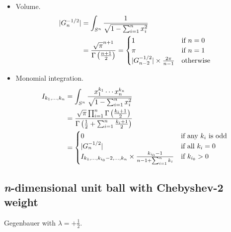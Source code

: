 \documentclass[draft]{scrartcl}
\begin{document}
\begin{itemize}
  \item Volume.
    \begin{align}\nonumber
    |G_n^{-1/2}|
      &= \int_{S^n} \frac{1}{\sqrt{1 - \sum_{i=1}^n x_i^2}}\\
      &= \frac{%
        \sqrt{\pi}^{n+1}
      }{%
        \Gamma\left(\frac{n+1}{2}\right)
      }
      =\begin{cases}
        1&\text{if $n=0$}\\
        \pi&\text{if $n=1$}\\
        |G_{n-2}^{-1/2}| \times \frac{2\pi}{n-1}&\text{otherwise}
      \end{cases}
    \end{align}

  \item Monomial integration.
    \begin{align}\nonumber
    I_{k_1,\dots,k_n}
      &= \int_{S^n} \frac{x_1^{k_1}\cdots x_n^{k_n}}{\sqrt{1 - \sum_{i=1}^n x_i^2}}\\
      &= \frac{%
        \sqrt{\pi} \prod_{i=1}^n \Gamma\left(\frac{k_i+1}{2}\right)
      }{%
        \Gamma\left(\frac{1}{2} + \sum_{i=1}^n \frac{k_i+1}{2}\right)
      }\\
      &= \begin{cases}
        0&\text{if any $k_i$ is odd}\\
        |G_n^{-1/2}|&\text{if all $k_i=0$}\\
        I_{k_1,\dots,k_{i_0}-2,\dots,k_n} \times \frac{k_{i_0}-1}{n-1 + \sum_{i=1}^n k_i}&\text{if $k_{i_0} > 0$}
      \end{cases}
    \end{align}
\end{itemize}


\subsection*{\textit{n}-dimensional unit ball with Chebyshev-2 weight}
Gegenbauer with $\lambda = +\frac{1}{2}$.
\end{document}
